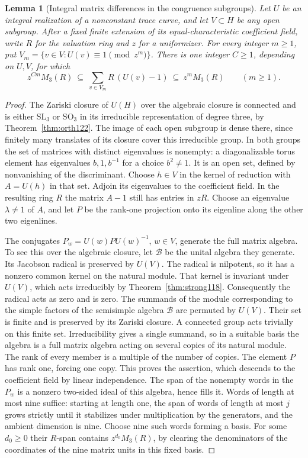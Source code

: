 \documentclass[a4paper,11pt]{article}
\newtheorem{lemma}[proposition]{Lemma}
\theoremstyle{definition}
\theoremstyle{remark}
\numberwithin{equation}{section}
\begin{document}
\begin{lemma}[Integral matrix differences in the congruence subgroups]
\leavevmode\label{lem:order238}
Let \(U\) be an integral realization of a nonconstant trace curve, and
let \(V\subset H\) be any open subgroup. After a fixed finite extension
of its equal-characteristic coefficient field, write \(R\) for the
valuation ring and \(z\) for a uniformizer. For every integer \(m\ge1\),
put \(V_m=\{v\in V:U(v)\equiv1\pmod {z^m}\}\).
There is one integer \(C\ge1\), depending on \(U,V\), for which
\[
 z^{Cm}M_3(R)\ \subseteq\
     \sum_{v\in V_m}R\,(U(v)-1)\ \subseteq\ z^m M_3(R)
                   \qquad(m\ge1).
\]
\end{lemma}
\begin{proof}
The Zariski closure of \(U(H)\) over the algebraic closure is connected
and is either \(\mathrm{SL}_3\) or \(\mathrm{SO}_3\) in its irreducible
representation of degree three, by Theorem~\ref{thm:orth122}. The image
of each open subgroup is dense there, since finitely many translates of
its closure cover this irreducible group. In both groups the set of
matrices with distinct eigenvalues is nonempty: a diagonalizable torus
element has eigenvalues \(b,1,b^{-1}\) for a choice \(b^2\ne1\).
It is an open set, defined by nonvanishing of the discriminant. Choose
\(h\in V\) in the kernel of reduction with \(A=U(h)\) in that set.
Adjoin its eigenvalues to the coefficient field. In the resulting
ring \(R\) the matrix \(A-1\) still has entries in \(zR\). Choose an
eigenvalue \(\lambda\ne1\) of \(A\), and let \(P\) be the rank-one
projection onto its eigenline along the other two eigenlines.

The conjugates \(P_w=U(w)P U(w)^{-1}\), \(w\in V\), generate the
full matrix algebra. To see this over the algebraic closure, let
\(\mathcal B\) be the unital algebra they generate. Its Jacobson
radical is preserved by \(U(V)\). The radical is nilpotent, so it has
a nonzero common kernel on the natural module. That kernel is invariant
under \(U(V)\), which acts irreducibly by Theorem~\ref{thm:strong118}.
Consequently the radical acts as zero and is zero. The summands of the
module corresponding to the simple factors of the semisimple algebra
\(\mathcal B\) are permuted by \(U(V)\). Their set is finite and is
preserved by its Zariski closure. A connected group acts trivially on
this finite set. Irreducibility gives a single summand, so in a suitable
basis the algebra is a full matrix algebra acting on several copies of
its natural module. The rank of every member is a multiple of the
number of copies. The element \(P\) has rank one, forcing one copy.
This proves the assertion, which descends to the coefficient field by
linear independence. The span of the nonempty words in the \(P_w\)
is a nonzero two-sided ideal of this algebra, hence fills it. Words of
length at most nine suffice: starting at length one, the span of words
of length at most \(j\) grows strictly until it stabilizes under
multiplication by the generators, and the ambient dimension is nine.
Choose nine such words forming a basis. For some \(d_0\ge0\) their
\(R\)-span contains \(z^{d_0}M_3(R)\), by clearing the denominators of
the coordinates of the nine matrix units in this fixed basis.


\end{proof}
\end{document}
